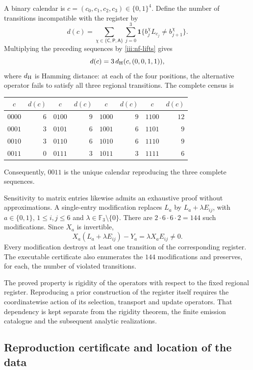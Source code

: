 A binary calendar is $c=(c_0,c_1,c_2,c_3)\in\{0,1\}^4$.
Define the number of transitions incompatible with the register by
\begin{equation}
 d(c)=\sum_{\chi\in\{\mathsf C,\mathsf P,\mathsf A\}}
       \sum_{j=0}^{3}
       \mathbf1\{b_j^\chi L_{c_j}\ne b_{j+1}^\chi\}.
 \label{iii:nf-calendario}
\end{equation}
Multiplying the preceding sequences by
\eqref{iii:nf-lifts} gives
\[
 d(c)=3\,d_{\rm H}(c,(0,0,1,1)),
\]
where $d_{\rm H}$ is Hamming distance: at each of the
four positions, the alternative operator fails to satisfy all three
regional transitions. The complete census is
\begin{center}
\begin{tabular}{cr@{\qquad}cr@{\qquad}cr@{\qquad}cr}
$c$&$d(c)$&$c$&$d(c)$&$c$&$d(c)$&$c$&$d(c)$\\ \hline
$0000$&$6$&$0100$&$9$&$1000$&$9$&$1100$&$12$\\
$0001$&$3$&$0101$&$6$&$1001$&$6$&$1101$&$9$\\
$0010$&$3$&$0110$&$6$&$1010$&$6$&$1110$&$9$\\
$0011$&$0$&$0111$&$3$&$1011$&$3$&$1111$&$6$
\end{tabular}
\end{center}
Consequently, $0011$ is the unique calendar reproducing the
three complete sequences.

Sensitivity to matrix entries likewise admits an
exhaustive proof without approximations. A single-entry modification
replaces $L_a$ by $L_a+\lambda E_{ij}$, with
$a\in\{0,1\}$, $1\le i,j\le6$ and
$\lambda\in\mathbb F_3\setminus\{0\}$. There are
$2\cdot6\cdot6\cdot2=144$ such modifications. Since
$X_a$ is invertible,
\[
 X_a(L_a+\lambda E_{ij})-Y_a
 =\lambda X_aE_{ij}\ne0.
\]
Every modification destroys at least one transition of the
corresponding register. The executable certificate also enumerates
the $144$ modifications and preserves, for each, the number of
violated transitions.

The proved property is rigidity of the operators with respect to the
fixed regional register. Reproducing a prior construction
of the register itself requires the coordinatewise action of its selection,
transport and update operators. That dependency is kept
separate from the rigidity theorem, the finite emission catalogue and
the subsequent analytic realizations.

\subsection{Reproduction certificate and location of the data}

